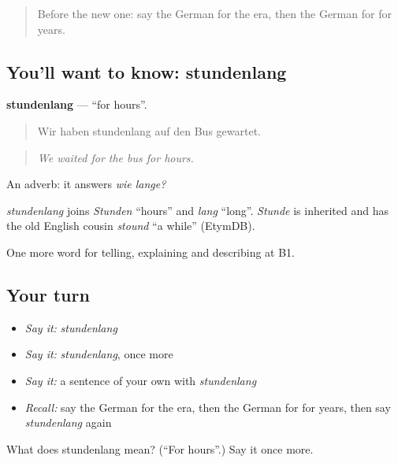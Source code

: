 \label{lesson:GE-C269-stundenlang}



\begin{quote}
Before the new one: say the German for the era, then the German for for years.
\end{quote}

\subsection*{You'll want to know: stundenlang}
\textbf{stundenlang} — \textquotedblleft{}for hours\textquotedblright{}.

\begin{quote}
Wir haben stundenlang auf den Bus gewartet.
\end{quote}

\begin{quote}
\emph{We waited for the bus for hours.}
\end{quote}

An adverb: it answers \emph{wie lange?}

\begin{cousinweb}
\emph{stundenlang} joins \emph{Stunden} \textquotedblleft{}hours\textquotedblright{} and \emph{lang} \textquotedblleft{}long\textquotedblright{}. \emph{Stunde} is inherited and has the old English cousin \emph{stound} \textquotedblleft{}a while\textquotedblright{} (EtymDB).
\end{cousinweb}

\begin{grammarlens}[title={What you've built}]
One more word for telling, explaining and describing at B1.
\end{grammarlens}

\subsection*{Your turn}
\begin{itemize}
\raggedright
  \item \emph{Say it:} \emph{stundenlang}
  \item \emph{Say it:} \emph{stundenlang}, once more
  \item \emph{Say it:} a sentence of your own with \emph{stundenlang}
  \item \emph{Recall:} say the German for the era, then the German for for years, then say \emph{stundenlang} again
\end{itemize}

\begin{tcolorbox}[breakable,colback=teal!4,colframe=teal!35!black,title={Before you move on}]
What does stundenlang mean? (\textquotedblleft{}For hours\textquotedblright{}.) Say it once more.
\end{tcolorbox}
